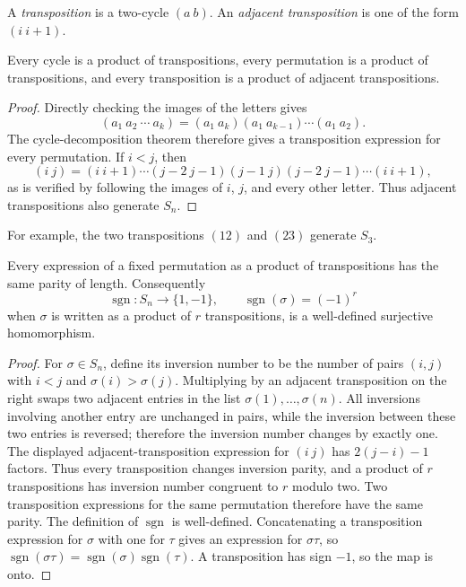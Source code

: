 \begin{definition}
A \emph{transposition} is a two-cycle \((a\ b)\).  An \emph{adjacent
transposition} is one of the form \((i\ i+1)\).
\end{definition}

\begin{proposition}
Every cycle is a product of transpositions, every permutation is a product of
transpositions, and every transposition is a product of adjacent transpositions.
\end{proposition}
\begin{proof}
Directly checking the images of the letters gives
\[(a_1\ a_2\ \cdots\ a_k)=(a_1\ a_k)(a_1\ a_{k-1})\cdots(a_1\ a_2).\]
The cycle-decomposition theorem therefore gives a transposition expression for
every permutation.  If \(i<j\), then
\[(i\ j)=(i\ i+1)\cdots(j-2\ j-1)(j-1\ j)(j-2\ j-1)\cdots(i\ i+1),\]
as is verified by following the images of \(i\), \(j\), and every other
letter.  Thus adjacent transpositions also generate \(S_n\).
\end{proof}

For example, the two transpositions \((12)\) and \((23)\) generate \(S_3\).

\begin{theorem}
Every expression of a fixed permutation as a product of transpositions has the
same parity of length.  Consequently
\[\operatorname{sgn}:S_n\longrightarrow\{1,-1\},\qquad
\operatorname{sgn}(\sigma)=(-1)^r\]
when \(\sigma\) is written as a product of \(r\) transpositions, is a
well-defined surjective homomorphism.
\end{theorem}
\begin{proof}
For \(\sigma\in S_n\), define its inversion number to be the number of pairs
\((i,j)\) with \(i<j\) and \(\sigma(i)>\sigma(j)\).  Multiplying by an
adjacent transposition on the right swaps two adjacent entries in the list
\(\sigma(1),\ldots,\sigma(n)\).  All inversions involving another entry are
unchanged in pairs, while the inversion between these two entries is reversed;
therefore the inversion number changes by exactly one.  The displayed
adjacent-transposition expression for \((i\ j)\) has
\(2(j-i)-1\) factors.  Thus every transposition changes inversion parity,
and a product of \(r\) transpositions has inversion number congruent to \(r\)
modulo two.  Two transposition expressions for the same permutation therefore
have the same parity.  The definition of \(\operatorname{sgn}\) is
well-defined.  Concatenating a transposition expression for \(\sigma\) with
one for \(\tau\) gives an expression for \(\sigma\tau\), so
\(\operatorname{sgn}(\sigma\tau)=\operatorname{sgn}(\sigma)
\operatorname{sgn}(\tau)\).  A transposition has sign \(-1\), so the map is
onto.
\end{proof}

